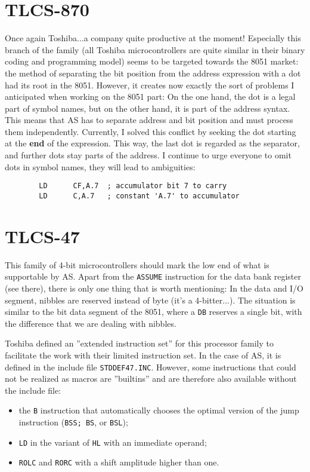 \documentclass[12pt,twoside]{report}
\newcommand{\bb}[1]{{\bf #1}}
\newcommand{\tty}[1]{{\tt #1}}
\newcommand{\asname}{{AS}}
\begin{document}

\section{TLCS-870}

Once again Toshiba...a company quite productive at the moment!
Especially this branch of the family (all Toshiba microcontrollers
are quite similar in their binary coding and programming model) seems
to be targeted towards the 8051 market: the method of separating the
bit position from the address expression with a dot had its root in
the 8051.  However, it creates now exactly the sort of problems I
anticipated when working on the 8051 part: On the one hand, the dot
is a legal part of symbol names, but on the other hand, it is part of
the address syntax.  This means that \asname{} has to separate address and
bit position and must process them independently.  Currently, I
solved this conflict by seeking the dot starting at the \bb{end} of the
expression.  This way, the last dot is regarded as the separator, and
further dots stay parts of the address.   I continue to urge everyone
to omit dots in symbol names, they will lead to ambiguities:
\begin{verbatim}
        LD      CF,A.7  ; accumulator bit 7 to carry
        LD      C,A.7   ; constant 'A.7' to accumulator
\end{verbatim}


\section{TLCS-47}

This family of 4-bit microcontrollers should mark the low end of what
is supportable by \asname{}.  Apart from the \tty{ASSUME} instruction for the data
bank register (see there), there is only one thing that is worth
mentioning: In the data and I/O segment, nibbles are reserved instead
of byte (it's a 4-bitter...).  The situation is similar to the bit
data segment of the 8051, where a \tty{DB} reserves a single bit, with the
difference that we are dealing with nibbles.

Toshiba defined an ''extended instruction set'' for this processor
family to facilitate the work with their limited instruction set.  In
the case of \asname{}, it is defined in the include file \tty{STDDEF47.INC}.
However, some instructions that could not be realized as macros are
''builtins'' and are therefore also available without the include file:
\begin{itemize}
\item{the \tty{B} instruction that automatically chooses the optimal version
      of the jump instruction (\tty{BSS; BS}, or \tty{BSL});}
\item{\tty{LD} in the variant of \tty{HL} with an immediate operand;}
\item{\tty{ROLC} and \tty{RORC} with a shift amplitude higher than one.}
\end{itemize}
\end{document}
